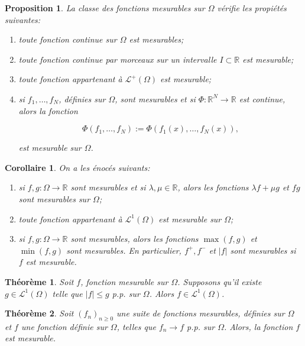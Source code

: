 \documentclass[10pt,a4paper,oneside]{article}
\newtheorem{theoreme}{Théorème}
\newtheorem{proposition}{Proposition}
\newtheorem{corollaire}{Corollaire}
\begin{document}
\begin{proposition}
La classe des fonctions mesurables sur $\Omega$ vérifie les propiétés suivantes:

\begin{enumerate}
\item
toute fonction continue sur $\Omega$ est mesurables;

\item
toute fonction continue par morceaux sur un intervalle $I \subset \mathbb{R}$ est mesurable;

\item
toute fonction appartenant à $\mathcal{L}^+(\Omega)$ est mesurable;

\item
si $f_1, \ldots, f_N$, définies sur $\Omega$, sont mesurables et si $\Phi : \mathbb{R}^N \to \mathbb{R}$ est continue, alors la fonction

\[ \Phi(f_1,\ldots,f_N) := \Phi(f_1(x),\ldots,f_N(x)), \]

est mesurable sur $\Omega$.
\end{enumerate}
\end{proposition}

\begin{corollaire}
On a les énocés suivants:

\begin{enumerate}
\item
si $f,g : \Omega \to \mathbb{R}$ sont mesurables et si $\lambda, \mu \in \mathbb{R}$, alors les fonctions $\lambda f + \mu g$ et $fg$ sont mesurables sur $\Omega$;

\item
toute fonction appartenant à $\mathcal{L}^1(\Omega)$ est mesurable sur $\Omega$;

\item
si $f,g : \Omega \to \mathbb{R}$ sont mesurables, alors les fonctions $\max(f,g)$ et $\min(f,g)$ sont mesurables. En particulier, $f^+,f^-$ et $|f|$ sont mesurables si $f$ est mesurable.
\end{enumerate}
\end{corollaire}

\begin{theoreme}
Soit $f$, fonction mesurable sur $\Omega$. Supposons qu'il existe $g \in \mathcal{L}^1(\Omega)$ telle que $|f| \leq g$ p.p. sur $\Omega$. Alors $f \in \mathcal{L}^1(\Omega)$.
\end{theoreme}

\begin{theoreme}
Soit $(f_n)_{n \geq 0}$ une suite de fonctions mesurables, définies sur $\Omega$ et $f$ une fonction définie sur $\Omega$, telles que $f_n \to f$ p.p. sur $\Omega$. Alors, la fonction $f$ est mesurable.
\end{theoreme}
\end{document}
